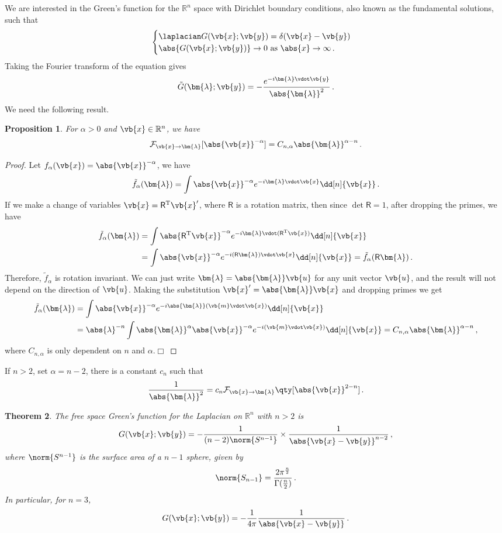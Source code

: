 \documentclass{article}
\theoremstyle{plain}\theoremheaderfont{\normalfont\itshape}\theorembodyfont{\rmfamily}\theoremseparator{.}\newtheorem*{rem}{Remark}\newtheorem*{ex}{Example}\newtheorem*{proof}{Proof}\newtheorem*{altp}{Alternative proof}
\theoremstyle{plain}\theoremheaderfont{\normalfont\bfseries}\theorembodyfont{\rmfamily}\theoremseparator{.}\newtheorem{thm}{Theorem}[section]\newtheorem{lem}[thm]{Lemma}\newtheorem{prop}[thm]{Proposition}\newtheorem*{cor}{Corollary}\newtheorem{defn}[thm]{Definition}\newtheorem{clm}[thm]{Claim}\newtheorem{clminproof}{Claim}
\theoremstyle{break}\theoremheaderfont{\normalfont\itshape}\theorembodyfont{\rmfamily}\theoremseparator{.\medskip}\newtheorem*{proofskip}{Proof}\newtheorem*{exs}{Examples}\newtheorem*{rems}{Remarks}
\theoremstyle{break}\theoremheaderfont{\normalfont\bfseries}\theorembodyfont{\rmfamily}\theoremseparator{.\medskip}\newtheorem{lemskip}[thm]{Lemma}\newtheorem{defnskip}[thm]{Definition}\newtheorem{propskip}[thm]{Proposition}\newtheorem{thmskip}[thm]{Theorem}
\numberwithin{equation}{section}
\newcommand{\qed}{\hfill\ensuremath{\Box}}
\newcommand{\bl}{\bm{\lambda}}
\newcommand{\tp}{^\mathrm{T}}
\begin{document}
	We are interested in the Green's function for the \(\mathbb{R}^n\) space with Dirichlet boundary conditions, also known as the fundamental solutions, such that
	\[\begin{cases}
		\laplacian G(\vb{x};\vb{y})=\delta(\vb{x}-\vb{y})\\
		\abs{G(\vb{x};\vb{y})}\to 0 \text{ as }\abs{x}\to\infty\,.
	\end{cases}\]
	Taking the Fourier transform of the equation gives
	\[\tilde{G}(\bl;\vb{y})=-\frac{e^{-i\bl\vdot\vb{y}}}{\abs{\bl}^2}\,.\]
	We need the following result.
	\begin{prop}
		For \(\alpha>0\) and \(\vb{x}\in\mathbb{R}^n\), we have
		\[\mathcal{F}_{\vb{x}\to\bl}[\abs{\vb{x}}^{-\alpha}]=C_{n,\alpha}\abs{\bl}^{\alpha-n}\,.\]
	\end{prop}
	\begin{proof}
		Let \(f_\alpha(\vb{x})=\abs{\vb{x}}^{-\alpha}\), we have
		\[\tilde{f}_\alpha(\bl)=\int\abs{\vb{x}}^{-\alpha}e^{-i\bl\vdot\vb{x}}\dd[n]{\vb{x}}\,.\]
		If we make a change of variables \(\vb{x}=\mathsf{R}\tp\vb{x}'\), where \(\mathsf{R}\) is a rotation matrix, then since \(\det{\mathsf{R}}=1\), after dropping the primes, we have
		\begin{align*}
			\tilde{f}_\alpha(\bl)&=\int\abs{\mathsf{R}\tp\vb{x}}^{-\alpha}e^{-i\bl\vdot(\mathsf{R}\tp\vb{x})}\dd[n]{\vb{x}}\\
			&=\int\abs{\vb{x}}^{-\alpha}e^{-i(\mathsf{R}\bl)\vdot\vb{x}}\dd[n]{\vb{x}}=\tilde{f}_\alpha(\mathsf{R}\bl)\,.
		\end{align*}
		Therefore, \(\tilde{f}_\alpha\) is rotation invariant. We can just write \(\bl=\abs{\bl}\vb{u}\) for any unit vector \(\vb{u}\), and the result will not depend on the direction of \(\vb{u}\). Making the substitution \(\vb{x}'=\abs{\bl}\vb{x}\) and dropping primes we get
		\begin{align*}
			\tilde{f}_\alpha(\bl)&=\int\abs{\vb{x}}^{-\alpha}e^{-i\abs{\bl}(\vb{m}\vdot\vb{x})}\dd[n]{\vb{x}}\\
			&=\abs{\lambda}^{-n}\int\abs{\bl}^\alpha\abs{\vb{x}}^{-\alpha}e^{-i(\vb{m}\vdot\vb{x})}\dd[n]{\vb{x}}=C_{n,\alpha}\abs{\bl}^{\alpha-n}\,,
		\end{align*}
		where \(C_{n,\alpha}\) is only dependent on \(n\) and \(\alpha\).\qed
	\end{proof}
	If \(n>2\), set \(\alpha=n-2\), there is a constant \(c_n\) such that
	\[\frac{1}{\abs{\bl}^2}=c_n\mathcal{F}_{\vb{x}\to\bl}\qty[\abs{\vb{x}}^{2-n}]\,.\]
	\begin{thm}
		The free space Green's function for the Laplacian on \(\mathbb{R}^n\) with \(n>2\) is
		\[G(\vb{x};\vb{y})=-\frac{1}{(n-2)\norm{S^{n-1}}}\times\frac{1}{\abs{\vb{x}-\vb{y}}^{n-2}}\,,\]
		where \(\norm{S^{n-1}}\) is the surface area of a \(n-1\) sphere, given by
		\[\norm{S_{n-1}}=\frac{2\pi^{\frac{n}{2}}}{\Gamma(\frac{n}{2})}\,.\]
		In particular, for \(n=3\),
		\[G(\vb{x};\vb{y})=-\frac{1}{4\pi}\frac{1}{\abs{\vb{x}-\vb{y}}}\,.\]
	\end{thm}
\end{document}
